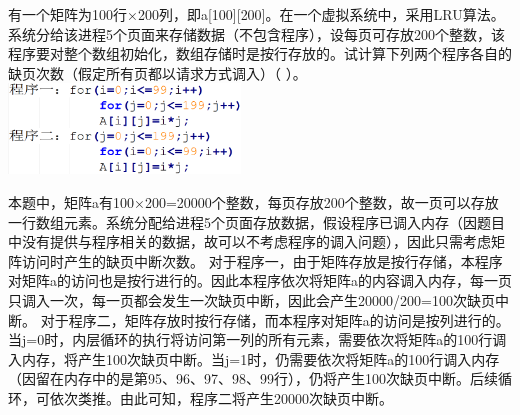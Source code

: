 \question 有一个矩阵为100行×200列，即a{[}100{]}{[}200{]}。在一个虚拟系统中，采用LRU算法。系统分给该进程5个页面来存储数据（不包含程序），设每页可存放200个整数，该程序要对整个数组初始化，数组存储时是按行存放的。试计算下列两个程序各自的缺页次数（假定所有页都以请求方式调入）（
）。\includegraphics[width=2.42708in,height=0.94792in]{computerassets/E52E0CBF83A575BF60173AB625D4B4A7.png}
\par{}
\begin{solution}本题中，矩阵a有100×200=20000个整数，每页存放200个整数，故一页可以存放一行数组元素。系统分配给进程5个页面存放数据，假设程序已调入内存（因题目中没有提供与程序相关的数据，故可以不考虑程序的调入问题），因此只需考虑矩阵访问时产生的缺页中断次数。
对于程序一，由于矩阵存放是按行存储，本程序对矩阵a的访问也是按行进行的。因此本程序依次将矩阵a的内容调入内存，每一页只调入一次，每一页都会发生一次缺页中断，因此会产生20000/200=100次缺页中断。
对于程序二，矩阵存放时按行存储，而本程序对矩阵a的访问是按列进行的。当j=0时，内层循环的执行将访问第一列的所有元素，需要依次将矩阵a的100行调入内存，将产生100次缺页中断。当j=1时，仍需要依次将矩阵a的100行调入内存（因留在内存中的是第95、96、97、98、99行），仍将产生100次缺页中断。后续循环，可依次类推。由此可知，程序二将产生20000次缺页中断。
\end{solution}
